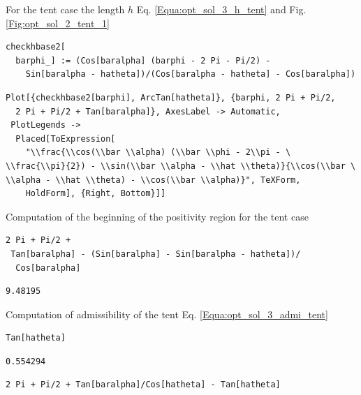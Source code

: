 \documentclass[reqno]{amsart}
\theoremstyle{definition} \newtheorem{definition}{Definition}[section]
\theoremstyle{definition} \newtheorem{remark}[definition]{Remark}
\theoremstyle{plain} \newtheorem{lemma}[definition]{Lemma}
\theoremstyle{plain} \newtheorem{proposition}[definition]{Proposition}
\theoremstyle{plain} \newtheorem{theorem}[definition]{Theorem}
\theoremstyle{plain} \newtheorem{corollary}[definition]{Corollary}
\theoremstyle{definition} \newtheorem{example}[definition]{Example}
\theoremstyle{plain} \newtheorem{claim}[clai]{Claim}
\theoremstyle{definition} \newtheorem{assumption}[definition]{Assumption}
\theoremstyle{definition} \newtheorem{observation}[definition]{Observation}
\newcommand{\1}{\mathbbm 1}
\newcommand{\smed}{\medskip}
\numberwithin{equation}{section} %
\theoremstyle{plain} \newtheorem*{theorem*}{Theorem}
\theoremstyle{plain} \newtheorem{mthm}[maintheorem]{Main Theorem}
\theoremstyle{plain} \newtheorem*{mthm*}{Main Theorem}
\theoremstyle{plain} \newtheorem*{conjecture*}{Conjecture}
\theoremstyle{plain} \newtheorem{conjecture}[definition]{Conjecture}
\theoremstyle{plain} \newtheorem*{problem*}{Problem}
\begin{document}
\smed
For the tent case the length $h$ Eq. \eqref{Equa:opt_sol_3_h_tent} and Fig. \ref{Fig:opt_sol_2_tent_1}
\smed
\begin{verbatim}
checkhbase2[
  barphi_] := (Cos[baralpha] (barphi - 2 Pi - Pi/2) - 
    Sin[baralpha - hatheta])/(Cos[baralpha - hatheta] - Cos[baralpha])
\end{verbatim}
\begin{verbatim}
Plot[{checkhbase2[barphi], ArcTan[hatheta]}, {barphi, 2 Pi + Pi/2, 
  2 Pi + Pi/2 + Tan[baralpha]}, AxesLabel -> Automatic, 
 PlotLegends -> 
  Placed[ToExpression[
    "\\frac{\\cos(\\bar \\alpha) (\\bar \\phi - 2\\pi - \
\\frac{\\pi}{2}) - \\sin(\\bar \\alpha - \\hat \\theta)}{\\cos(\\bar \
\\alpha - \\hat \\theta) - \\cos(\\bar \\alpha)}", TeXForm, 
    HoldForm], {Right, Bottom}]]
\end{verbatim}
\smed
Computation of the beginning of the positivity region for the tent case
\smed
\begin{verbatim}
2 Pi + Pi/2 + 
 Tan[baralpha] - (Sin[baralpha] - Sin[baralpha - hatheta])/
  Cos[baralpha]
\end{verbatim}
\begin{verbatim}
9.48195
\end{verbatim}
\smed
Computation of admissibility of the tent Eq. \eqref{Equa:opt_sol_3_admi_tent}
\smed
\begin{verbatim}
Tan[hatheta]
\end{verbatim}
\begin{verbatim}
0.554294
\end{verbatim}
\begin{verbatim}
2 Pi + Pi/2 + Tan[baralpha]/Cos[hatheta] - Tan[hatheta]
\end{verbatim}
\end{document}
